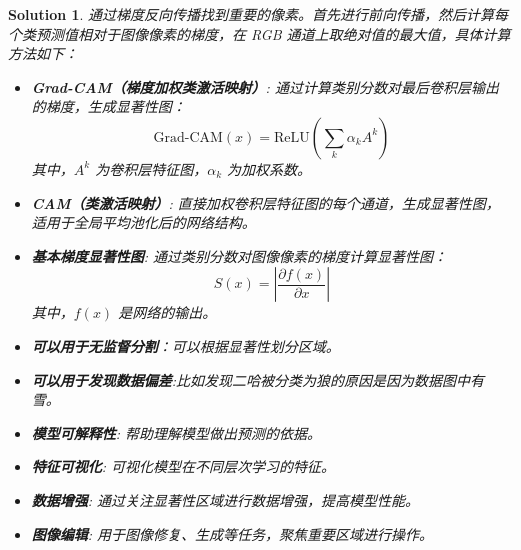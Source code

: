 \documentclass{article}
\newcommand{\myred}[1]{{\color{red}{#1}}} %
\theoremstyle{Problem}
\theoremstyle{Solution}
\newtheorem*{sol}{Solution}
\begin{document}
	\begin{sol}
	\myred{计算方法：}
	通过梯度反向传播找到重要的像素。首先进行前向传播，然后计算每个类预测值相对于图像像素的梯度，在 RGB 通道上取绝对值的最大值，具体计算方法如下：
	
	\begin{itemize}
		\item \textbf{Grad-CAM（梯度加权类激活映射）}: 通过计算类别分数对最后卷积层输出的梯度，生成显著性图：
		\[
		\text{Grad-CAM}(x) = \text{ReLU}\left( \sum_{k} \alpha_k A^k \right)
		\]
		其中，\( A^k \) 为卷积层特征图，\(\alpha_k\) 为加权系数。
		
		\item \textbf{CAM（类激活映射）}: 直接加权卷积层特征图的每个通道，生成显著性图，适用于全局平均池化后的网络结构。
		
		\item \textbf{基本梯度显著性图}: 通过类别分数对图像像素的梯度计算显著性图：
		\[
		S(x) = \left| \frac{\partial f(x)}{\partial x} \right|
		\]
		其中，\( f(x) \) 是网络的输出。
	\end{itemize}
	\myred{用途：}
	\begin{itemize}
		\item \textbf{可以用于无监督分割}：可以根据显著性划分区域。
		\item \textbf{可以用于发现数据偏差}:比如发现二哈被分类为狼的原因是因为数据图中有雪。
		\item \textbf{模型可解释性}: 帮助理解模型做出预测的依据。
		\item \textbf{特征可视化}: 可视化模型在不同层次学习的特征。
		\item \textbf{数据增强}: 通过关注显著性区域进行数据增强，提高模型性能。
		\item \textbf{图像编辑}: 用于图像修复、生成等任务，聚焦重要区域进行操作。\\
	\end{itemize}
	\end{sol}
	
\end{document}
